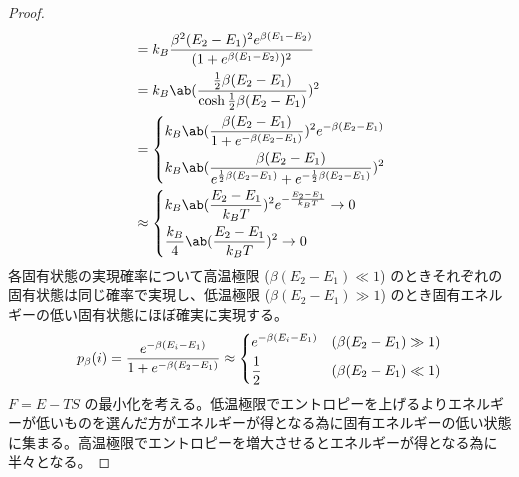 \documentclass[a4paper,11pt]{jlreq}
\begin{document}
\begin{proof}
\begin{align}
      & = k_B\frac{\beta^2(E_2 - E_1)^2e^{\beta(E_1 - E_2)}}{(1 + e^{\beta(E_1 - E_2)})^2}                                            \\
      & = k_B\ab(\frac{\frac{1}{2}\beta(E_2 - E_1)}{\cosh\frac{1}{2}\beta(E_2 - E_1)})^2                                              \\
      & = \begin{dcases}
            k_B\ab(\frac{\beta(E_2 - E_1)}{1 + e^{-\beta(E_2 - E_1)}})^2e^{-\beta(E_2 - E_1)} \\
            k_B\ab(\frac{\beta(E_2 - E_1)}{e^{\frac{1}{2}\beta(E_2 - E_1)} + e^{-\frac{1}{2}\beta(E_2 - E_1)}})^2
          \end{dcases}        \\
      & \approx \begin{dcases}
                  k_B\ab(\frac{E_2 - E_1}{k_BT})^2e^{-\frac{E_2 - E_1}{k_BT}} \to 0 \\
                  \frac{k_B}{4}\ab(\frac{E_2 - E_1}{k_BT})^2 \to 0
                \end{dcases}
  \end{align}
  各固有状態の実現確率について高温極限 ($\beta(E_2 - E_1) \ll 1$) のときそれぞれの固有状態は同じ確率で実現し、低温極限 ($\beta(E_2 - E_1) \gg 1$) のとき固有エネルギーの低い固有状態にほぼ確実に実現する。
  \begin{align}
    \quad p_\beta(i) & = \frac{e^{-\beta (E_i - E_1)}}{1 + e^{-\beta(E_2 - E_1)}} \approx \begin{dcases}
                                                                                            e^{-\beta (E_i - E_1)} & (\beta(E_2 - E_1) \gg 1) \\
                                                                                            \frac{1}{2}            & (\beta(E_2 - E_1) \ll 1)
                                                                                          \end{dcases}
  \end{align}
  $F = E - TS$ の最小化を考える。低温極限でエントロピーを上げるよりエネルギーが低いものを選んだ方がエネルギーが得となる為に固有エネルギーの低い状態に集まる。高温極限でエントロピーを増大させるとエネルギーが得となる為に半々となる。
\end{proof}
\end{document}
